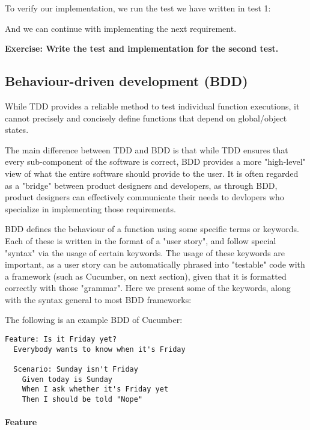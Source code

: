
To verify our implementation, we run the test we have written in test 1:


And we can continue with implementing the next requirement. 

\textbf{Exercise: Write the test and implementation for the second test.}

\subsection{Behaviour-driven development (BDD)}

While TDD provides a reliable method to test individual function executions, it cannot precisely and concisely define functions that depend on global/object states.

The main difference between TDD and BDD is that while TDD ensures that every sub-component of the software is correct, BDD provides a more "high-level" view of what the entire software should provide to the user. It is often regarded as a "bridge" between product designers and developers, as through BDD, product designers can effectively communicate their needs to devlopers who specialize in implementing those requirements. 

BDD defines the behaviour of a function using some specific terms or keywords. Each of these is written in the format of a "user story", and follow special "syntax" via the usage of certain keywords. The usage of these keywords are important, as a user story can be automatically phrased into "testable" code with a framework (such as Cucumber, on next section), given that it is formatted correctly with those "grammar". Here we present some of the keywords, along with the syntax general to most BDD frameworks:

The following is an example BDD of Cucumber:

\begin{lstlisting}[style=Cpp]
Feature: Is it Friday yet?
  Everybody wants to know when it's Friday

  Scenario: Sunday isn't Friday
    Given today is Sunday
    When I ask whether it's Friday yet
    Then I should be told "Nope"
\end{lstlisting}

\paragraph{Feature}

